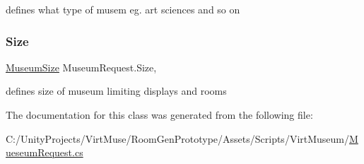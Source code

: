 defines what type of musem eg. art sciences and so on 

\mbox{\label{class_museum_request_a82207d17f80d3a624e7784ffe21c6f43}} 
\subsubsection{\texorpdfstring{Size}{Size}}
{\footnotesize\ttfamily \mbox{\hyperlink{_mueseum_request_8cs_a462fa84e99cf703318040e54f14146a2}{Museum\+Size}} Museum\+Request.\+Size\hspace{0.3cm}{\ttfamily [get]}, {\ttfamily [set]}}



defines size of museum limiting displays and rooms 



The documentation for this class was generated from the following file\+:\begin{DoxyCompactItemize}
\item 
C\+:/\+Unity\+Projects/\+Virt\+Muse/\+Room\+Gen\+Prototype/\+Assets/\+Scripts/\+Virt\+Museum/\mbox{\hyperlink{_mueseum_request_8cs}{Mueseum\+Request.\+cs}}\end{DoxyCompactItemize}

